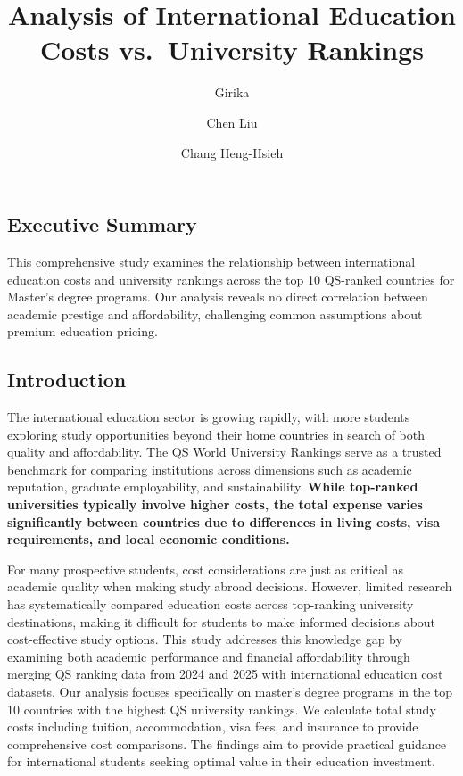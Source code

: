 \documentclass[
  letterpaper,
  DIV=11,
  numbers=noendperiod]{scrartcl}
\title{Analysis of International Education Costs vs.~University
Rankings}
\author{Girika \and Chen Liu \and Chang Heng-Hsieh}
\date{}
\begin{document}
\maketitle


\subsection{Executive Summary}\label{executive-summary}

This comprehensive study examines the relationship between international
education costs and university rankings across the top 10 QS-ranked
countries for Master's degree programs. Our analysis reveals no direct
correlation between academic prestige and affordability, challenging
common assumptions about premium education pricing.

\subsection{Introduction}\label{introduction}

The international education sector is growing rapidly, with more
students exploring study opportunities beyond their home countries in
search of both quality and affordability. The QS World University
Rankings serve as a trusted benchmark for comparing institutions across
dimensions such as academic reputation, graduate employability, and
sustainability. \textbf{While top-ranked universities typically involve
higher costs, the total expense varies significantly between countries
due to differences in living costs, visa requirements, and local
economic conditions.}

For many prospective students, cost considerations are just as critical
as academic quality when making study abroad decisions. However, limited
research has systematically compared education costs across top-ranking
university destinations, making it difficult for students to make
informed decisions about cost-effective study options. This study
addresses this knowledge gap by examining both academic performance and
financial affordability through merging QS ranking data from 2024 and
2025 with international education cost datasets. Our analysis focuses
specifically on master's degree programs in the top 10 countries with
the highest QS university rankings. We calculate total study costs
including tuition, accommodation, visa fees, and insurance to provide
comprehensive cost comparisons. The findings aim to provide practical
guidance for international students seeking optimal value in their
education investment.
\end{document}
